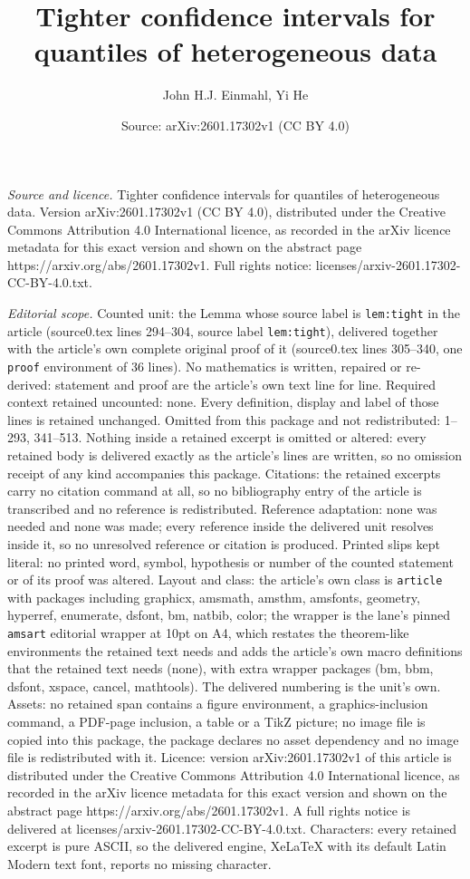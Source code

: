 \documentclass[10pt,a4paper]{amsart}
\title[Tighter confidence intervals for quantiles of heterogeneous ]{Tighter confidence intervals for quantiles of heterogeneous data}
\author{John H.J. Einmahl, Yi He}
\date{Source: arXiv:2601.17302v1 (CC BY 4.0)}
\begin{document}
\maketitle

\noindent\emph{Source and licence.} Tighter confidence intervals for quantiles of heterogeneous data. Version arXiv:2601.17302v1 (CC BY 4.0), distributed under the Creative Commons Attribution 4.0 International licence, as recorded in the arXiv licence metadata for this exact version and shown on the abstract page https://arxiv.org/abs/2601.17302v1. Full rights notice: licenses/arxiv-2601.17302-CC-BY-4.0.txt.\par\smallskip

\noindent\textit{Editorial scope.} Counted unit: the Lemma whose source label is \texttt{lem:tight} in the article (source0.tex lines 294--304, source label \texttt{lem:tight}), delivered together with the article's own complete original proof of it (source0.tex lines 305--340, one \texttt{proof} environment of 36 lines). No mathematics is written, repaired or re-derived: statement and proof are the article's own text line for line. Required context retained uncounted: none. Every definition, display and label of those lines is retained unchanged. Omitted from this package and not redistributed: 1--293, 341--513. Nothing inside a retained excerpt is omitted or altered: every retained body is delivered exactly as the article's lines are written, so no omission receipt of any kind accompanies this package. Citations: the retained excerpts carry no citation command at all, so no bibliography entry of the article is transcribed and no reference is redistributed. Reference adaptation: none was needed and none was made; every reference inside the delivered unit resolves inside it, so no unresolved reference or citation is produced. Printed slips kept literal: no printed word, symbol, hypothesis or number of the counted statement or of its proof was altered. Layout and class: the article's own class is \texttt{article} with packages including graphicx, amsmath, amsthm, amsfonts, geometry, hyperref, enumerate, dsfont, bm, natbib, color; the wrapper is the lane's pinned \texttt{amsart} editorial wrapper at 10pt on A4, which restates the theorem-like environments the retained text needs and adds the article's own macro definitions that the retained text needs (none), with extra wrapper packages (bm, bbm, dsfont, xspace, cancel, mathtools). The delivered numbering is the unit's own. Assets: no retained span contains a figure environment, a graphics-inclusion command, a PDF-page inclusion, a table or a TikZ picture; no image file is copied into this package, the package declares no asset dependency and no image file is redistributed with it. Licence: version arXiv:2601.17302v1 of this article is distributed under the Creative Commons Attribution 4.0 International licence, as recorded in the arXiv licence metadata for this exact version and shown on the abstract page https://arxiv.org/abs/2601.17302v1. A full rights notice is delivered at licenses/arxiv-2601.17302-CC-BY-4.0.txt. Characters: every retained excerpt is pure ASCII, so the delivered engine, XeLaTeX with its default Latin Modern text font, reports no missing character.
\end{document}
